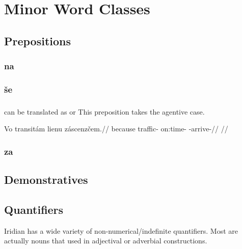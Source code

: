 \chapter{Minor Word Classes}\label{chap:minor}

\section{Prepositions}

\subsection{na}

\subsection{\v{s}e}

\subsection{}

 can be translated as  or  This preposition takes the agentive case.

\pex
\begingl
\gla Vo transit\'am lienu z\'ascenz\v{c}em.//
\glb because traffic- on:time- -arrive-//
\glft {}//
\endgl
\xe

\subsection{za}


\section{Demonstratives}\label{dem-adj}

\section{Quantifiers}
Iridian has a wide variety of non-numerical/indefinite quantifiers.  Most are actually nouns that used in adjectival or adverbial constructions.


